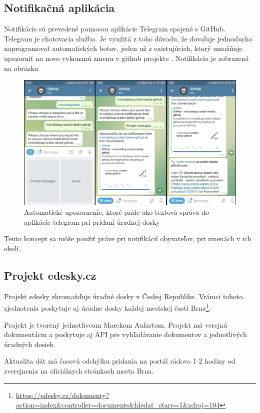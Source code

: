 \subsection{Notifikačná aplikácia}
Notifikácie sú prevedené pomocou aplikácie Telegram spojené s GitHub. Telegram je chatovacia služba. Je využitá z toho dôvodu, že dovoľuje jednoducho naprogramovať automatických botov, jeden už z existujúcich, ktorý umožňuje upozorniť na novo vykonanú zmenu v github projekte  \cite{notifikacniAplikace}. Notifikácia je zobrazená na obrázku 

\begin{figure}[H]
	\centering
	\includegraphics[width=0.85 \linewidth]{img/TelegramNotifikaceUredniDeska.png}
	\caption{Automatické upozornenie, ktoré príde ako textová správa do aplikácie telegram pri pridaní úradnej dosky}
	\label{TelegramNotifikaceUredniDeska}
\end{figure}

\noindent
Tento koncept sa môže použiť práve pri notifikácií obyvateľov, pri zmenách v ich okolí.



\subsection{Projekt edesky.cz}
Projekt edesky zhromažďuje úradné dosky v Českej Republike. Vrámci tohoto zjednotenia poskytuje aj úradne dosky každej mestskej časti Brna\footnote{\url{https://edesky.cz/dokumenty?action=index&controller=documents&hledat_stare=1&zdroj=104}}.


Projekt je tvorený jednotlivcom Marekom Aufartom. Projekt má verejnú dokumentáciu a poskytuje aj API pre vyhľadávanie dokumentov a jednotlivých úradných dosiek.

Aktualita dát má časovú odchýlku pridania na portál rádovo 1-2 hodiny od zverejnenia na oficiálnych stránkach mesta Brna.



